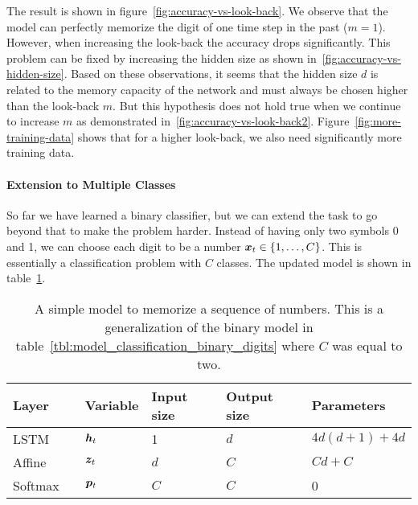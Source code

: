 		The result is shown in figure~\ref{fig:accuracy-vs-look-back}. 
		We observe that the model can perfectly memorize the digit of one time step in the past ($m = 1$).
		However, when increasing the look-back the accuracy drops significantly.
		This problem can be fixed by increasing the hidden size as shown in~\ref{fig:accuracy-vs-hidden-size}.
		Based on these observations, it seems that the hidden size $d$ is related to the memory capacity of the network and must always be chosen higher than the look-back $m$. 
		But this hypothesis does not hold true when we continue to increase $m$ as demonstrated in~\ref{fig:accuracy-vs-look-back2}.
		Figure~\ref{fig:more-training-data} shows that for a higher look-back, we also need significantly more training data. 
		
		\paragraph{Extension to Multiple Classes}
		So far we have learned a binary classifier, but we can extend the task to go beyond that to make the problem harder.
		Instead of having only two symbols 0 and 1, we can choose each digit to be a number $\bm{x}_t \in \{1, \dots, C\}$.
		This is essentially a classification problem with $C$ classes.
		The updated model is shown in table~\ref{tbl:model_classification_multi_class_digits}.
		\begin{table}[tb]
			\small
			\begin{center}
				\begin{tabular}{lp{0.3cm}llll}
					\toprule
					Layer 	& & Variable 			& Input size 	& Output size 	& Parameters 			\\
					\midrule 
					LSTM 	& & $\bm{h}_t$		& 1 			& $d$ 			& $4d(d + 1) + 4d$ 		\\ 
					Affine 	& & $\bm{z}_t$		& $d$ 			& $C$ 			& $Cd + C$ 				\\ 
					Softmax & & $\bm{p}_t$		& $C$ 			& $C$ 			& 0						\\ \bottomrule
				\end{tabular}
			\end{center}
			\caption[A simple model to memorize a sequence of numbers]
					{A simple model to memorize a sequence of numbers.
					 This is a generalization of the binary model in table~\ref{tbl:model_classification_binary_digits} where $C$ was equal to two.
					 \label{tbl:model_classification_multi_class_digits}}
		
		\end{table}

